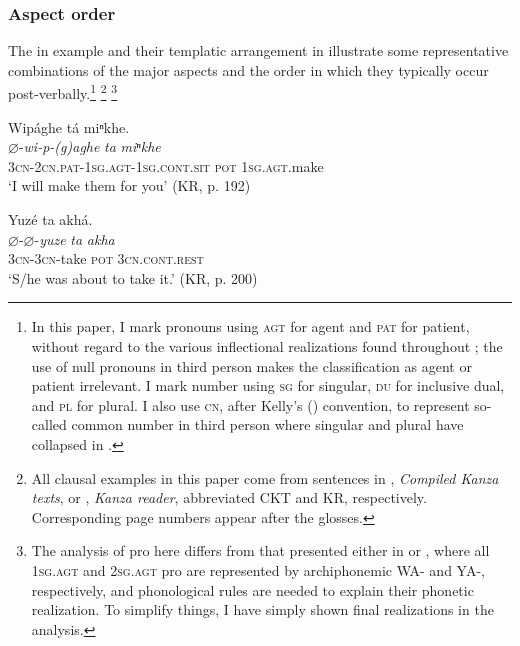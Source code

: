\documentclass[output=paper]{LSP/langsci}
\begin{document}
\subsubsection{Aspect order} 

The  in example  and their templatic arrangement in  illustrate some representative combinations of the major aspects and the order in which they typically occur post-verbally.\footnote{In this paper, I mark pronouns using \textsc{agt} for agent and \textsc{pat} for patient, without regard to the various inflectional realizations found throughout ; the use of null pronouns in third person makes the classification as agent or patient irrelevant. I mark number using \textsc{sg} for singular, \textsc{du} for inclusive dual, and \textsc{pl} for plural. I also use \textsc{cn}, after Kelly's (\citeyear{Kelly1992})   convention, to represent so-called common number in third person where singular and plural have collapsed in .} \footnote{All clausal examples in this paper come from sentences in  \citet{McBrideCumberland2009}, \textit{Compiled Kanza texts}, or \citet{McBrideCumberland2010}, \textit{Kanza reader}, abbreviated CKT and KR, respectively. Corresponding page numbers appear after the  glosses.} \footnote{The analysis of pro here differs from that presented either in \citet{Quintero2004} or \citet{Rankin2005b}, where all \textsc{1sg.agt} and \textsc{2sg.agt} pro are represented by archiphonemic WA- and YA-, respectively, and phonological rules are needed to explain their phonetic realization. To simplify things, I have simply shown final realizations in the analysis.}

\ea\label{postverbalorder}

\ea\label{postverbalorder1}{Wipághe tá miⁿkhe.\\ 
\gll
$\varnothing$-\textit{wi-p-(g)aghe}  \textit{ta}  \textit{miⁿkhe} \\
 \textsc{3cn-2cn.pat-1sg.agt-1sg.cont.sit}   \textsc{pot}   \textsc{1sg.agt}.make \\
\glt  `I will make them for you' (KR, p. 192) \\
}

\ex\label{postverbalorder2}{Yuz\'e ta akhá.\\ 
\gll
$\varnothing$-$\varnothing$-\textit{yuze}   \textit{ta}  \textit{akha} \\
\textsc{3cn-3cn}-take  \textsc{pot}  \textsc{3cn.cont.rest} \\
\glt  `S/he was about to take it.' (KR, p. 200) \\
}
\end{document}
